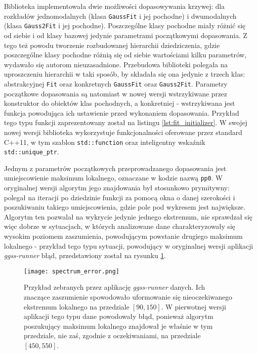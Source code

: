 Biblioteka implementowała dwie możliwości dopasowywania krzywej: dla rozkładów jednomodalnych (klasa \lstinline{GaussFit} i jej pochodne) i dwumodalnych (klasa \lstinline{Gauss2Fit} i jej pochodne). Poszczególne klasy pochodne miały różnić się od siebie i od klasy bazowej jedynie parametrami początkowymi dopasowania. Z tego też powodu tworzenie rozbudowanej hierarchii dziedziczenia, gdzie poszczególne klasy pochodne różnią się od siebie wartościami kilku parametrów, wydawało się autorom nieuzasadnione. Przebudowa biblioteki polegała na uproszczeniu hierarchii w taki sposób, by składała się ona jedynie z trzech klas: abstrakcyjnej \lstinline{Fit} oraz konkretnych \lstinline{GaussFit} oraz \lstinline{Gauss2Fit}. Parametry początkowe dopasowania są natomiast w nowej wersji wstrzykiwane przez konstruktor do obiektów klas pochodnych, a konkretniej - wstrzykiwana jest funkcja powodująca ich ustawienie przed wykonaniem dopasowania. Przykład tego typu funkcji zaprezentowany został na listingu \ref{lst:fit_initializer}. W swojej nowej wersji biblioteka wykorzystuje funkcjonalności oferowane przez standard C++11, w tym szablon \lstinline{std::function} oraz inteligentny wskaźnik \lstinline{std::unique_ptr}.




Jednym z parametrów początkowych przeprowadzanego dopasowania jest umiejscowienie maksimum lokalnego, oznaczane w kodzie nazwą \lstinline{pp0}. W oryginalnej wersji algorytm jego znajdowania był stosunkowo prymitywny: polegał na iteracji po dziedzinie funkcji za pomocą okna o danej szerokości i poszukiwaniu takiego umiejscowienia, gdzie pole pod wykresem jest największe. Algorytm ten pozwalał na wykrycie jedynie jednego ekstremum, nie sprawdzał się więc dobrze w sytuacjach, w których analizowane dane charakteryzowały się wysokim poziomem zaszumienia, powodującym powstanie drugiego maksimum lokalnego - przykład tego typu sytuacji, powodujący w oryginalnej wersji aplikacji \emph{ggss-runner} błąd, przedstawiony został na rysunku \ref{fig:spectrum_error}.

\begin{figure}[H]
\centering
\texttt{[image: spectrum\_error.png]}
\caption{Przykład zebranych przez aplikację \emph{ggss-runner} danych. Ich znaczące zaszumienie spowodowało uformowanie się nieoczekiwanego ekstremum lokalnego na przedziale $[90, 150]$. W pierwotnej wersji aplikacji tego typu dane powodowały błąd, ponieważ algorytm poszukujący maksimum lokalnego znajdował je właśnie w tym przedziale, nie zaś, zgodnie z oczekiwaniami, na przedziale $[450, 550]$.}
\label{fig:spectrum_error}
\end{figure}

